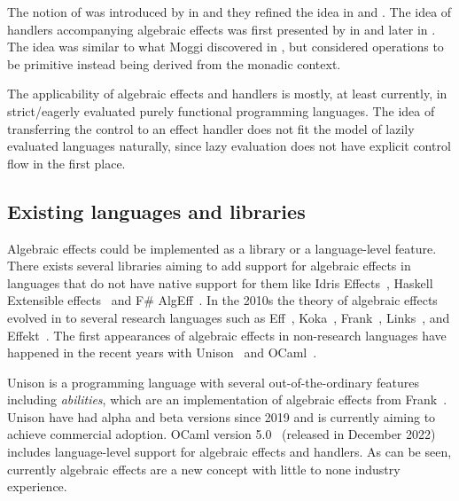 The notion of  was introduced by \textcite{adequacy-for-alg-effs} in \citeyear{adequacy-for-alg-effs} and they refined the idea in \cite{comp-effs-and-ops} and \cite{alg-ops-gen-effs}. The idea of handlers accompanying algebraic effects was first presented by \textcite{handlers-of-alg-effs} in \citeyear{handlers-of-alg-effs} and later \textcite{handling-alg-effs} in \citeyear{handling-alg-effs}. The idea was similar to what Moggi discovered in \cite{notions-computations}, but \citeauthor{adequacy-for-alg-effs} considered operations to be primitive instead being derived from the monadic context.

The applicability of algebraic effects and handlers is mostly, at least currently, in strict/eagerly evaluated purely functional programming languages. The idea of transferring the control to an effect handler does not fit the model of lazily evaluated languages naturally, since lazy evaluation does not have explicit control flow in the first place.~\cite{alg-effs-for-fp}


\subsection{Existing languages and libraries}
Algebraic effects could be implemented as a library or a language-level feature. There exists several libraries aiming to add support for algebraic effects in languages that do not have native support for them like Idris Effects~\cite{idris-effects}, Haskell Extensible effects~\cite{extensible-effects} and F\# AlgEff~\cite{fsharp-alg-eff}. In the 2010s the theory of algebraic effects evolved in to several research languages such as Eff~\cite{eff-lang}, Koka~\cite{koka-lang}, Frank~\cite{frank-lang}, Links~\cite{links-lang}, and Effekt~\cite{effekt-lang}. The first appearances of algebraic effects in non-research languages have happened in the recent years with Unison~\cite{unison-lang} and OCaml~\cite{ocaml-lang}.

Unison is a programming language with several out-of-the-ordinary features including \textit{abilities}, which are an implementation of algebraic effects from Frank~\cite{frank-lang}. Unison have had alpha and beta versions since 2019 and is currently aiming to achieve commercial adoption. OCaml version 5.0~\cite{ocaml-v5} (released in December 2022) includes language-level support for algebraic effects and handlers. As can be seen, currently algebraic effects are a new concept with little to none industry experience.



